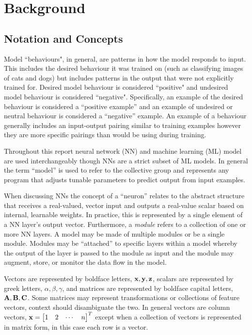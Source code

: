 \chapter{Background}

\section{Notation and Concepts}

Model ``behaviours", in general, are patterns in how the model responds to input.
This includes the desired behaviour it was trained on (such as classifying images of cats and dogs) but includes patterns in the output that were not explicitly trained for.
Desired model behaviour is considered ``positive" and undesired model behaviour is considered ``negative".
Specifically, an example of the desired behaviour is considered a ``positive example'' and an example of undesired or neutral behaviour is considered a ``negative'' example.
An example of a behaviour generally includes an input-output pairing similar to training examples however they are more specific pairings than would be using during training.

Throughout this report neural network (NN) and machine learning (ML) model are used interchangeably though NNs are a strict subset of ML models.
In general the term ``model'' is used to refer to the collective group and represents any program that adjusts tunable parameters to predict output from input examples.

When discussing NNs the concept of a ``neuron'' relates to the abstract structure that receives a real-valued, vector input and outputs a real-value scalar based on internal, learnable weights.
In practice, this is represented by a single element of a NN layer's output vector.
Furthermore, a \emph{module} refers to a collection of one or more NN layers.
A model may be made of multiple modules or be a single module.
Modules may be ``attached'' to specific layers within a model whereby the output of the layer is passed to the module as input and the module may augment, store, or monitor the data flow in the model.

Vectors are represented by boldface letters, $\mathbf{x}, \mathbf{y}, \mathbf{z}$, scalars are represented by greek letters, $\alpha, \beta, \gamma$, and matrices are represented by boldface capital letters, $\mathbf{A}, \mathbf{B}, \mathbf{C}$.
Some matrices may represent transformations or collections of feature vectors, context should disambiguate the two.
In general vectors are column vectors, $\vx = \begin{bmatrix*}
    1 & 2 & \cdots & n
\end{bmatrix*}^T$ except when a collection of vectors is represented in matrix form, in this case each row is a vector.

